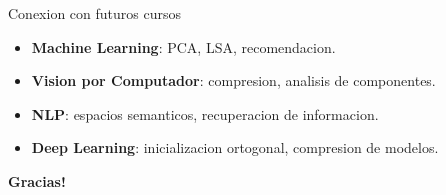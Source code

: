 \documentclass[aspectratio=169, 10pt, xcolor=table]{beamer}
\begin{document}
\begin{frame}{Conexion con futuros cursos}
    \begin{itemize}
        \item \textbf{Machine Learning}: PCA, LSA, recomendacion.
        \item \textbf{Vision por Computador}: compresion, analisis de componentes.
        \item \textbf{NLP}: espacios semanticos, recuperacion de informacion.
        \item \textbf{Deep Learning}: inicializacion ortogonal, compresion de modelos.
    \end{itemize}
\end{frame}

\begin{frame}
    \centering
    \Huge \textbf{Gracias!}

\end{frame}
\end{document}
